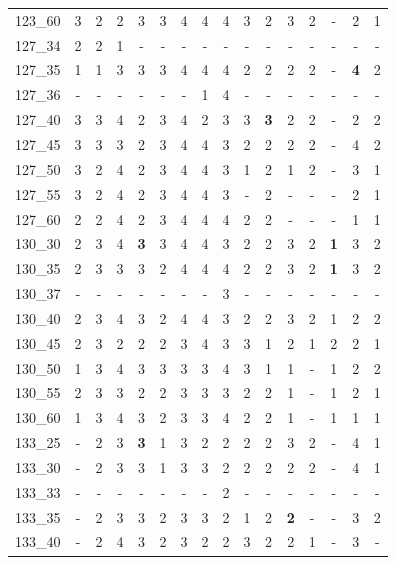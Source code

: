 {\begin{longtable}{lccccccccccccccc}
123\_60 & 3 & 2 & 2 & 3 & 3 & 4 & 4 & 4 & 3 & 2 & 3 & 2 & - & 2 & 1 \\
127\_34 & 2 & 2 & 1 & - & - & - & - & - & - & - & - & - & - & - & - \\
127\_35 & 1 & 1 & 3 & 3 & 3 & 4 & 4 & 4 & 2 & 2 & 2 & 2 & - & \cellcolor{green!20}\textbf{4} & 2 \\
127\_36 & - & - & - & - & - & - & 1 & 4 & - & - & - & - & - & - & - \\
127\_40 & 3 & 3 & 4 & 2 & 3 & 4 & 2 & 3 & 3 & \cellcolor{green!20}\textbf{3} & 2 & 2 & - & 2 & 2 \\
127\_45 & 3 & 3 & 3 & 2 & 3 & 4 & 4 & 3 & 2 & 2 & 2 & 2 & - & 4 & 2 \\
127\_50 & 3 & 2 & 4 & 2 & 3 & 4 & 4 & 3 & 1 & 2 & 1 & 2 & - & 3 & 1 \\
127\_55 & 3 & 2 & 4 & 2 & 3 & 4 & 4 & 3 & - & 2 & - & - & - & 2 & 1 \\
127\_60 & 2 & 2 & 4 & 2 & 3 & 4 & 4 & 4 & 2 & 2 & - & - & - & 1 & 1 \\
130\_30 & 2 & 3 & 4 & \cellcolor{green!20}\textbf{3} & 3 & 4 & 4 & 3 & 2 & 2 & 3 & 2 & \cellcolor{green!20}\textbf{1} & 3 & 2 \\
130\_35 & 2 & 3 & 3 & 3 & 2 & 4 & 4 & 4 & 2 & 2 & 3 & 2 & \cellcolor{green!20}\textbf{1} & 3 & 2 \\
130\_37 & - & - & - & - & - & - & - & 3 & - & - & - & - & - & - & - \\
130\_40 & 2 & 3 & 4 & 3 & 2 & 4 & 4 & 3 & 2 & 2 & 3 & 2 & 1 & 2 & 2 \\
130\_45 & 2 & 3 & 2 & 2 & 2 & 3 & 4 & 3 & 3 & 1 & 2 & 1 & 2 & 2 & 1 \\
130\_50 & 1 & 3 & 4 & 3 & 3 & 3 & 3 & 4 & 3 & 1 & 1 & - & 1 & 2 & 2 \\
130\_55 & 2 & 3 & 3 & 2 & 2 & 3 & 3 & 3 & 2 & 2 & 1 & - & 1 & 2 & 1 \\
130\_60 & 1 & 3 & 4 & 3 & 2 & 3 & 3 & 4 & 2 & 2 & 1 & - & 1 & 1 & 1 \\
133\_25 & - & 2 & 3 & \cellcolor{green!20}\textbf{3} & 1 & 3 & 2 & 2 & 2 & 2 & 3 & 2 & - & 4 & 1 \\
133\_30 & - & 2 & 3 & 3 & 1 & 3 & 3 & 2 & 2 & 2 & 2 & 2 & - & 4 & 1 \\
133\_33 & - & - & - & - & - & - & - & 2 & - & - & - & - & - & - & - \\
133\_35 & - & 2 & 3 & 3 & 2 & 3 & 3 & 2 & 1 & 2 & \cellcolor{green!20}\textbf{2} & - & - & 3 & 2 \\
133\_40 & - & 2 & 4 & 3 & 2 & 3 & 2 & 2 & 3 & 2 & 2 & 1 & - & 3 & - \\

\end{longtable}}
